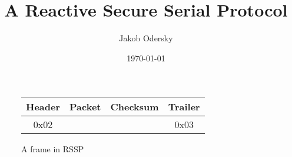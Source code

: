 \documentclass[10pt,a4paper]{article}
\title{A Reactive Secure Serial Protocol}
\date{\today}
\author{Jakob Odersky\\{\small \mail{jodersky@gmail.com}}}
\begin{document}
\maketitle
\tableofcontents
\pagestyle{plain}
\newpage

\begin{figure}
\begin{centering}

\begin{tabular}{|c|c|c|c|}\hline
Header & Packet & Checksum & Trailer \\ \hline
0x02 & & & 0x03
\end{tabular}




\end{centering}
\caption{A frame in RSSP}
\end{figure}



% 

%
%
\end{document}
